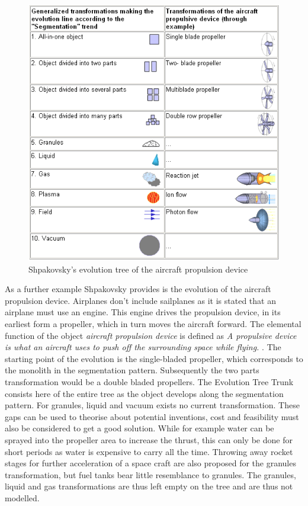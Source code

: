 \documentclass[11pt,a4paper]{article}
\begin{document}
\begin{figure}[htb]
	\centering
	\includegraphics[width=0.75\linewidth]{figures/aircraft.png}
	\caption{\small Shpakovsky's evolution tree of the aircraft propulsion device \cite{Shpakovsky2003}}
	\label{fig:aircraft}
\end{figure}

As a further example Shpakovsky provides is the evolution of the aircraft propulsion device. Airplanes don't include sailplanes as it is stated that an airplane must use an engine. This engine drives the propulsion device, in its earliest form a propeller, which in turn moves the aircraft forward. The elemental function of the object \textit{aircraft propulsion device} is defined as \textit{A propulsive device is what an aircraft uses to push off the surrounding space while flying.} \cite{Shpakovsky2003}.
The starting point of the evolution is the single-bladed propeller, which corresponds to the monolith in the segmentation pattern. Subsequently the two parts transformation would be a double bladed propellers. The Evolution Tree Trunk consists here of the entire tree as the object develops along the segmentation pattern.
For granules, liquid and vacuum exists no current transformation. These gaps can be used to theorise about potential inventions, cost and feasibility must also be considered to get a good solution. While for example water can be sprayed into the propeller area to increase the thrust, this can only be done for short periods as water is expensive to carry all the time. Throwing away rocket stages for further acceleration of a space craft are also proposed for the granules transformation, but fuel tanks bear little resemblance to granules. The granules, liquid and gas transformations are thus left empty on the tree and are thus not modelled.
\end{document}
